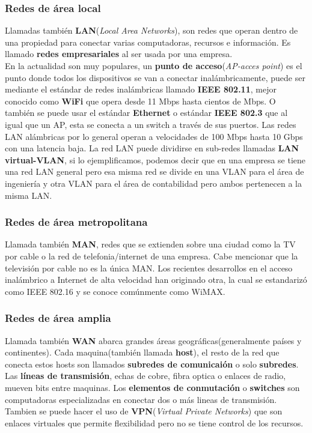 \documentclass[
	12pt, %
	fleqn, %
	a4paper, %
]{LegrandOrangeBook}
\begin{document}
\subsubsection{Redes de área local}
Llamadas también \textbf{LAN}(\textit{Local Area Networks}), son redes que operan dentro de una propiedad para conectar varias computadoras, recursos e información. Es llamado \textbf{redes empresariales} al ser usada por una empresa.\\
En la actualidad son muy populares, un \textbf{punto de acceso}(\textit{AP-acces point}) es el punto donde todos los dispositivos se van a conectar inalámbricamente, puede ser mediante el estándar de redes inalámbricas llamado \textbf{IEEE 802.11}, mejor conocido como \textbf{WiFi} que opera desde 11 Mbps hasta cientos de Mbps. O también se puede usar el estándar \textbf{Ethernet} o estándar \textbf{IEEE 802.3} que al igual que un AP, esta se conecta a un switch a través de sus puertos. Las redes LAN alámbricas por lo general operan a velocidades de 100 Mbps hasta 10 Gbps con una latencia baja. La red LAN puede dividirse en sub-redes llamadas \textbf{LAN virtual-VLAN}, si lo ejemplificamos, podemos decir que en una empresa se tiene una red LAN general pero esa misma red se divide en una VLAN para el área de ingeniería y otra VLAN para el área de contabilidad pero ambos pertenecen a la misma LAN.
\subsubsection{Redes de área metropolitana}
Llamada también \textbf{MAN}, redes que se extienden sobre una ciudad como la TV por cable o la red de telefonia/internet de una empresa. Cabe mencionar que la televisión por cable no es la única MAN. Los recientes desarrollos en
el acceso inalámbrico a Internet de alta velocidad han originado otra, la cual se estandarizó como IEEE 802.16 y se conoce comúnmente como WiMAX.
\subsubsection{Redes de área amplia}
Llamada también \textbf{WAN} abarca grandes áreas geográficas(generalmente países y continentes). Cada maquina(también llamada \textbf{host}), el resto de la red que conecta estos hosts son llamados \textbf{subredes de comunicaión} o solo \textbf{subredes}. Las \textbf{líneas de transmisión}, echas de cobre, fibra optica o enlaces de radio, mueven bits entre maquinas. Los \textbf{elementos de conmutación} o \textbf{switches} son computadoras especializadas en conectar dos o más lineas de transmisión. Tambien se puede hacer el uso de \textbf{VPN}(\textit{Virtual Private Networks}) que son enlaces virtuales que permite flexibilidad pero no se tiene control de los recursos.
\end{document}
